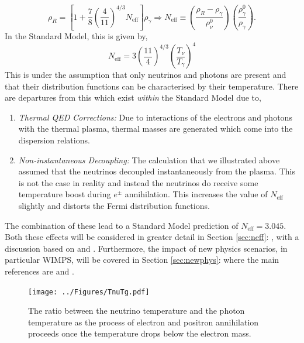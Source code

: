 \documentclass[11pt]{article}
\numberwithin{equation}{section}
\numberwithin{figure}{section}
\numberwithin{table}{section}
\begin{document}
\begin{equation}
\rho_R = \left[1 + \frac{7}{8}\left(\frac{4}{11}\right)^{4/3}N_{\mathrm{eff}}\right]\rho_\gamma \Rightarrow N_{\mathrm{eff}} \equiv \left(\frac{\rho_R - \rho_\gamma}{\rho_\nu^0}\right) \left(\frac{\rho_\gamma^0}{\rho_\gamma}\right).
\end{equation}
In the Standard Model, this is given by,
\begin{equation}
N_{\mathrm{eff}} = 3\left(\frac{11}{4}\right)^{4/3} \left(\frac{T_\nu}{T_\gamma}\right)^4
\end{equation}
This is under the assumption that only neutrinos and photons are present and that their distribution functions can be characterised by their temperature. There are departures from this which exist \textit{within} the Standard Model due to,
\begin{enumerate}
\item \textit{Thermal QED Corrections:} Due to interactions of the electrons and photons with the thermal plasma, thermal masses are generated which come into the dispersion relations.
\item \textit{Non-instantaneous Decoupling:} The calculation that we illustrated above assumed that the neutrinos decoupled instantaneously from the plasma. This is not the case in reality and instead the neutrinos do receive some temperature boost during $e^{\pm}$ annihilation. This increases the value of $N_{\mathrm{eff}}$ slightly and distorts the Fermi distribution functions.
\end{enumerate}
The combination of these lead to a Standard Model prediction of $N_{\mathrm{eff}} = 3.045$. Both these effects will be considered in greater detail in Section \ref{sec:neff}: \textit{}, with a discussion based on \cite{Mangano:2001iu} and \cite{Escudero:2018mvt}. Furthermore, the impact of new physics scenarios, in particular WIMPS, will be covered in Section \ref{sec:newphys}: \textit{} where the main references are \cite{Boehm:2013jpa} and \cite{Nollett:2014lwa}.
\begin{figure}[t]
\begin{center}
\texttt{[image: ../Figures/TnuTg.pdf]}
\caption{The ratio between the neutrino temperature and the photon temperature as the process of electron and positron annihilation proceeds once the temperature drops below the electron mass.}\label{fig:tnutg}
\end{center}
\end{figure}
\end{document}
